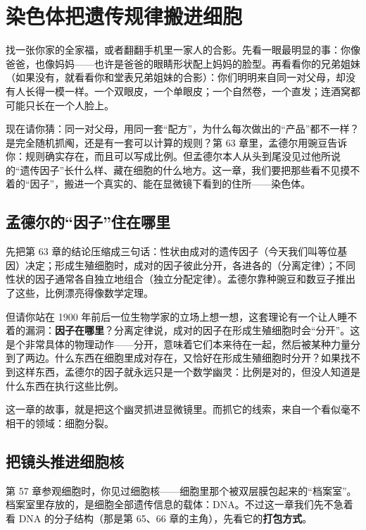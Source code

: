 \chapter{染色体把遗传规律搬进细胞}

\begin{kaichang}
找一张你家的全家福，或者翻翻手机里一家人的合影。先看一眼最明显的事：你像爸爸，也像妈妈——也许是爸爸的眼睛形状配上妈妈的脸型。再看看你的兄弟姐妹（如果没有，就看看你和堂表兄弟姐妹的合影）：你们明明来自同一对父母，却没有人长得一模一样。一个双眼皮，一个单眼皮；一个自然卷，一个直发；连酒窝都可能只长在一个人脸上。

现在请你猜：同一对父母，用同一套“配方”，为什么每次做出的“产品”都不一样？是完全随机抓阄，还是有一套可以计算的规则？第 63 章里，孟德尔用豌豆告诉你：规则确实存在，而且可以写成比例。但孟德尔本人从头到尾没见过他所说的“遗传因子”长什么样、藏在细胞的什么地方。这一章，我们要把那些看不见摸不着的“因子”，搬进一个真实的、能在显微镜下看到的住所——染色体。
\end{kaichang}

\section{孟德尔的“因子”住在哪里}

先把第 63 章的结论压缩成三句话：性状由成对的遗传因子（今天我们叫等位基因）决定；形成生殖细胞时，成对的因子彼此分开，各进各的（分离定律）；不同性状的因子通常各自独立地组合（独立分配定律）。孟德尔靠种豌豆和数豆子推出了这些，比例漂亮得像数学定理。

但请你站在 1900 年前后一位生物学家的立场上想一想，这套理论有一个让人睡不着的漏洞：\textbf{因子在哪里}？分离定律说，成对的因子在形成生殖细胞时会“分开”。这是个非常具体的物理动作——分开，意味着它们本来待在一起，然后被某种力量分到了两边。什么东西在细胞里成对存在，又恰好在形成生殖细胞时分开？如果找不到这样东西，孟德尔的因子就永远只是一个数学幽灵：比例是对的，但没人知道是什么东西在执行这些比例。

这一章的故事，就是把这个幽灵抓进显微镜里。而抓它的线索，来自一个看似毫不相干的领域：细胞分裂。

\section{把镜头推进细胞核}

第 57 章参观细胞时，你见过细胞核——细胞里那个被双层膜包起来的“档案室”。档案室里存放的，是细胞全部遗传信息的载体：DNA。不过这一章我们先不急着看 DNA 的分子结构（那是第 65、66 章的主角），先看它的\textbf{打包方式}。

